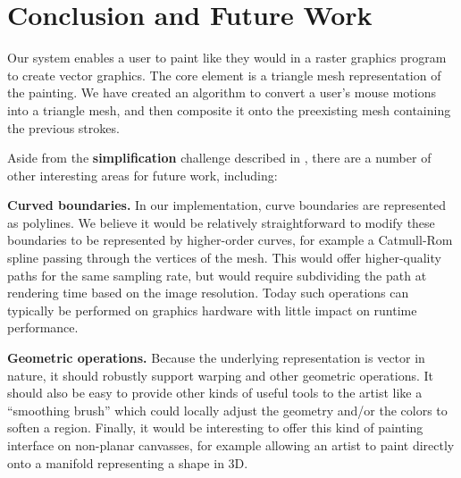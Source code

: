 \documentclass[conference]{acmsiggraph}
\begin{document}
\section{Conclusion and Future Work}
Our system enables a user to paint like they would in a raster graphics program 
to create vector graphics. The core element is a triangle mesh representation of the painting.
We have created an algorithm to convert a user's mouse motions into a triangle mesh, and then composite it onto the preexisting mesh containing the previous strokes.

Aside from the {\bf simplification} challenge described in , there are a number of other interesting areas for future work, including:

\noindent
{\bf Curved boundaries.}
In our implementation, curve boundaries are represented as polylines. We believe it would be relatively straightforward to modify these boundaries to be represented by higher-order curves, 
for example a Catmull-Rom spline passing through the vertices of the mesh. This would offer
higher-quality paths for the same sampling rate, but would require subdividing the path at
rendering time based on the image resolution. Today such operations can typically be 
performed on graphics hardware with little impact on runtime performance.

\noindent
{\bf Geometric operations.}
Because the underlying representation is vector in nature, it should robustly support warping and
other geometric operations. It should also be easy to provide other kinds of useful tools to the 
artist like a ``smoothing brush'' which could locally adjust the geometry and/or the colors to soften a region. Finally, it would be interesting to offer this kind of painting interface on non-planar canvasses, for example allowing an artist to paint directly onto a manifold representing a shape in 3D.




\end{document}

